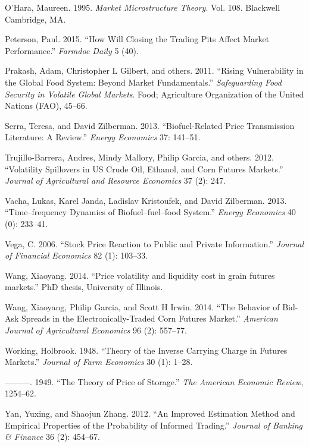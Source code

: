 \documentclass[]{elsarticle} %
\begin{document}
O'Hara, Maureen. 1995. \emph{Market Microstructure Theory}. Vol. 108.
Blackwell Cambridge, MA.

Peterson, Paul. 2015. ``How Will Closing the Trading Pits Affect Market
Performance.'' \emph{Farmdoc Daily} 5 (40).

Prakash, Adam, Christopher L Gilbert, and others. 2011. ``Rising
Vulnerability in the Global Food System: Beyond Market Fundamentals.''
\emph{Safeguarding Food Security in Volatile Global Markets}. Food;
Agriculture Organization of the United Nations (FAO), 45--66.

Serra, Teresa, and David Zilberman. 2013. ``Biofuel-Related Price
Transmission Literature: A Review.'' \emph{Energy Economics} 37:
141--51.

Trujillo-Barrera, Andres, Mindy Mallory, Philip Garcia, and others.
2012. ``Volatility Spillovers in US Crude Oil, Ethanol, and Corn Futures
Markets.'' \emph{Journal of Agricultural and Resource Economics} 37 (2):
247.

Vacha, Lukas, Karel Janda, Ladislav Kristoufek, and David Zilberman.
2013. ``Time--frequency Dynamics of Biofuel--fuel--food System.''
\emph{Energy Economics} 40 (0): 233--41.

Vega, C. 2006. ``Stock Price Reaction to Public and Private
Information.'' \emph{Journal of Financial Economics} 82 (1): 103--33.

Wang, Xiaoyang. 2014. ``Price volatility and liquidity cost in grain
futures markets.'' PhD thesis, University of Illinois.

Wang, Xiaoyang, Philip Garcia, and Scott H Irwin. 2014. ``The Behavior
of Bid-Ask Spreads in the Electronically-Traded Corn Futures Market.''
\emph{American Journal of Agricultural Economics} 96 (2): 557--77.

Working, Holbrook. 1948. ``Theory of the Inverse Carrying Charge in
Futures Markets.'' \emph{Journal of Farm Economics} 30 (1): 1--28.

---------. 1949. ``The Theory of Price of Storage.'' \emph{The American
Economic Review}, 1254--62.

Yan, Yuxing, and Shaojun Zhang. 2012. ``An Improved Estimation Method
and Empirical Properties of the Probability of Informed Trading.''
\emph{Journal of Banking \& Finance} 36 (2): 454--67.
\end{document}
